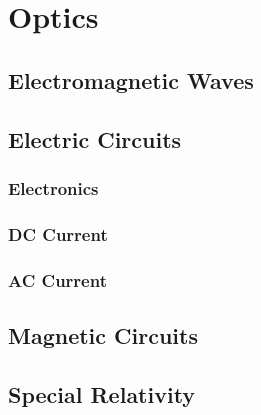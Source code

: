 \documentclass{book}
\theoremstyle{definition}
\theoremstyle{remark}
\begin{document}
\part{Optics}
\chapter{Electromagnetic Waves}
\appendix
\chapter{Electric Circuits}
\section{Electronics}
\section{DC Current}
\section{AC Current}
\chapter{Magnetic Circuits}
\chapter{Special Relativity}

\nocite{griffem,jackson,landau2,zangwillem}
\printbibliography
\end{document}
